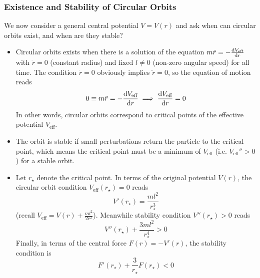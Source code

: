 \documentclass[11pt, a4paper]{article}
\newcommand{\veff}{V_{\text{eff}}}  %
\begin{document}
\subsubsection{Existence and Stability of Circular Orbits}
We now consider a general central potential $ V = V(r) $ and ask when can circular orbits exist, and when are they stable? 
\begin{itemize}

	\item Circular orbits exists when there is a solution of the equation $ m\ddot{r} = - \dv{\veff}{r} $ with $ \dot{r} = 0 $ (constant radius) and fixed $ l \neq 0 $ (non-zero angular speed) for all time. The condition $ \dot{r} = 0 $ obviously implies $ \ddot{r} = 0 $, so the equation of motion reads
	\begin{equation*}
		0 \equiv m \ddot{r} = - \dv{\veff}{r} \implies \dv{\veff}{r} = 0
	\end{equation*}
	In other words, circular orbits correspond to critical points of the effective potential $ \veff $.
	
	\item The orbit is stable if small perturbations return the particle to the critical point, which means the critical point must be a minimum of $ \veff $ (i.e. $ \veff'' > 0 $) for a stable orbit.
	
	\item Let $ r_{\star} $ denote the critical point. In terms of the original potential $ V(r) $, the circular orbit condition $ \veff(r_{\star}) = 0 $ reads
	\begin{equation*}
		V'(r_{\star}) = \frac{ml^{2}}{r_{\star}^{3}}
	\end{equation*}
	(recall $ \veff = V(r) + \frac{ml^{2}}{2r^{2}} $). Meanwhile stability condition $ V''(r_{\star}) > 0 $ reads
	\begin{equation*}
		V''(r_{\star}) + \frac{3ml^{2}}{r_{\star}^{4}} > 0
	\end{equation*}
	Finally, in terms of the central force $ F(r) = - V'(r) $, the stability condition is
	\begin{equation*}
		F'(r_{\star}) + \frac{3}{r_{\star}} F(r_{\star}) < 0
	\end{equation*}
\end{itemize}
\end{document}
